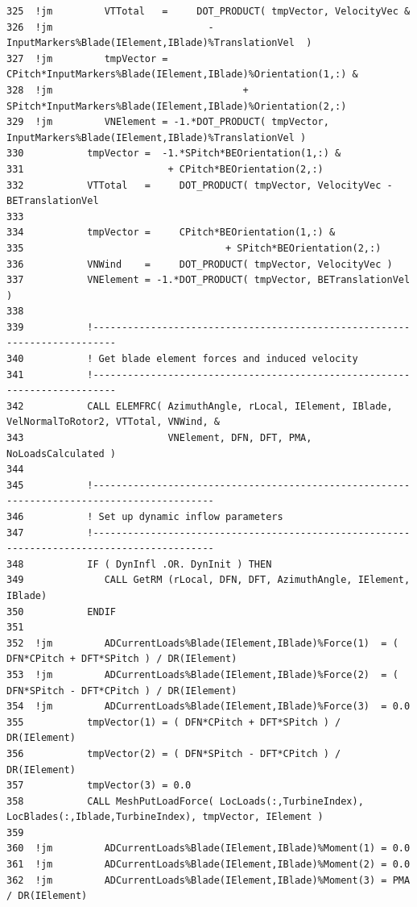 \documentclass[11pt]{article}
\begin{document}
{\begin{verbatim}
325  !jm         VTTotal   =     DOT_PRODUCT( tmpVector, VelocityVec &
326  !jm                           - InputMarkers%Blade(IElement,IBlade)%TranslationVel  )
327  !jm         tmpVector =     CPitch*InputMarkers%Blade(IElement,IBlade)%Orientation(1,:) &
328  !jm                                 + SPitch*InputMarkers%Blade(IElement,IBlade)%Orientation(2,:)
329  !jm         VNElement = -1.*DOT_PRODUCT( tmpVector, InputMarkers%Blade(IElement,IBlade)%TranslationVel )
330           tmpVector =  -1.*SPitch*BEOrientation(1,:) &
331                         + CPitch*BEOrientation(2,:)
332           VTTotal   =     DOT_PRODUCT( tmpVector, VelocityVec - BETranslationVel
333  
334           tmpVector =     CPitch*BEOrientation(1,:) &
335                                   + SPitch*BEOrientation(2,:)
336           VNWind    =     DOT_PRODUCT( tmpVector, VelocityVec )
337           VNElement = -1.*DOT_PRODUCT( tmpVector, BETranslationVel )
338  
339           !--------------------------------------------------------------------------
340           ! Get blade element forces and induced velocity
341           !--------------------------------------------------------------------------
342           CALL ELEMFRC( AzimuthAngle, rLocal, IElement, IBlade, VelNormalToRotor2, VTTotal, VNWind, &
343                         VNElement, DFN, DFT, PMA, NoLoadsCalculated )  
344  
345           !-------------------------------------------------------------------------------------------
346           ! Set up dynamic inflow parameters
347           !-------------------------------------------------------------------------------------------
348           IF ( DynInfl .OR. DynInit ) THEN
349              CALL GetRM (rLocal, DFN, DFT, AzimuthAngle, IElement, IBlade)
350           ENDIF
351  
352  !jm         ADCurrentLoads%Blade(IElement,IBlade)%Force(1)  = ( DFN*CPitch + DFT*SPitch ) / DR(IElement)
353  !jm         ADCurrentLoads%Blade(IElement,IBlade)%Force(2)  = ( DFN*SPitch - DFT*CPitch ) / DR(IElement)
354  !jm         ADCurrentLoads%Blade(IElement,IBlade)%Force(3)  = 0.0
355           tmpVector(1) = ( DFN*CPitch + DFT*SPitch ) / DR(IElement)
356           tmpVector(2) = ( DFN*SPitch - DFT*CPitch ) / DR(IElement)
357           tmpVector(3) = 0.0
358           CALL MeshPutLoadForce( LocLoads(:,TurbineIndex), LocBlades(:,Iblade,TurbineIndex), tmpVector, IElement )
359  
360  !jm         ADCurrentLoads%Blade(IElement,IBlade)%Moment(1) = 0.0
361  !jm         ADCurrentLoads%Blade(IElement,IBlade)%Moment(2) = 0.0
362  !jm         ADCurrentLoads%Blade(IElement,IBlade)%Moment(3) = PMA / DR(IElement)

\end{verbatim}}
\end{document}
